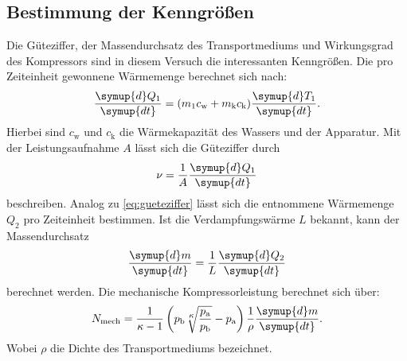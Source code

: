 \subsection{Bestimmung der Kenngrößen}
\label{sec:BdK}
Die Güteziffer, der Massendurchsatz des Transportmediums und Wirkungsgrad des Kompressors sind in diesem Versuch die
interessanten Kenngrößen.
Die pro Zeiteinheit gewonnene Wärmemenge berechnet sich nach:
\begin{equation}
	\frac{\symup{d}Q_1}{\symup{dt}}=(m_1c_{\text{w}}+m_{\text{k}}c_{\text{k}}) \frac{\symup{d}T_1}{\symup{dt}}.
	\label{eq:gueteziffer}
\end{equation}
Hierbei sind $c_{\text{w}}$ und $c_{\text{k}}$ die Wärmekapazität des Wassers und der Apparatur.
Mit der Leistungsaufnahme $A$ lässt sich die Güteziffer durch
\begin{equation}
	\nu=\frac{1}{A}\frac{\symup{d}Q_1}{\symup{dt}}
    \label{eq:leistung}
\end{equation}
beschreiben.
Analog zu \eqref{eq:gueteziffer} lässt sich die entnommene Wärmemenge $Q_2$ pro Zeiteinheit bestimmen.
Ist die Verdampfungswärme $L$ bekannt, kann der Massendurchsatz
\begin{equation}
	\frac{\symup{d}m}{\symup{dt}}=\frac{1}{L}\frac{\symup{d}Q_2}{\symup{dt}}
	\label{eq:massendurchsatz}
\end{equation}
berechnet werden.
Die mechanische Kompressorleistung berechnet sich über:
\begin{equation}
	N_{\text{mech}} = \frac{1}{\kappa - 1} \left( p_{\text{b}}
        \sqrt[{\leftroot{-1}\uproot{2}\scriptstyle \kappa}]{
        \frac{p_{\text{a}}}{p_{\text{b}}}} -p_{\text{a}}\right)
        \frac{1}{\rho}
        \frac{\symup{d}m}{\symup{dt}}.
	\label{eq:arbeit}
\end{equation}
Wobei $\rho$ die Dichte des Transportmediums bezeichnet.
